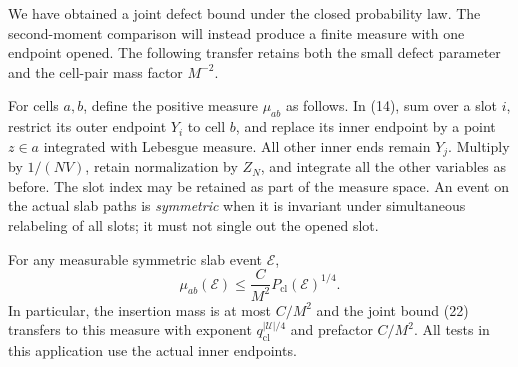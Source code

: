 We have obtained a joint defect bound under the closed probability
law. The second-moment comparison will instead produce a finite
measure with one endpoint opened. The following transfer retains both
the small defect parameter and the cell-pair mass factor $M^{-2}$.

For cells $a,b$, define the positive measure $\mu_{ab}$ as
follows. In (14), sum over a slot $i$, restrict its outer endpoint
$Y_i$ to cell $b$, and replace its inner endpoint by a point
$z\in a$ integrated with Lebesgue measure. All other inner
ends remain $Y_j$. Multiply by $1/(NV)$, retain normalization
by $Z_N$, and integrate all the other variables as before.
The slot index may be retained as part of the measure space.
An event on the actual slab paths is \emph{symmetric} when
it is invariant under simultaneous relabeling of all slots;
it must not single out the opened slot.

\begin{proposition}\label{prop:insertion-comparison}
For any measurable symmetric slab event $\mathcal E$,
\begin{equation}
 \mu_{ab}(\mathcal E)
 \leq\frac C{M^2}P_{\mathrm{cl}}(\mathcal E)^{1/4}.
 \tag{23}\label{eq:23}
\end{equation}
In particular, the insertion mass is at most $C/M^2$ and
the joint bound (22) transfers to this measure with exponent
$q_{\mathrm{cl}}^{|\mathcal U|/4}$ and prefactor $C/M^2$.
All tests in this application use the actual inner endpoints.
\end{proposition}

